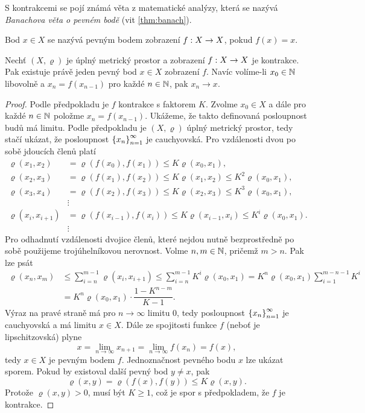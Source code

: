 S kontrakcemi se pojí známá věta z matematické analýzy, která se nazývá \emph{Banachova věta o pevném bodě} (vit \ref{thm:banach}).
\begin{definition}\label{def:pevny-bod}
    Bod $x\in X$ se nazývá pevným bodem zobrazení $f:X \rightarrow X$, pokud $f(x)=x$.
\end{definition}
\begin{theorem}\label{thm:banach}
    Nechť $(X,\varrho)$ je úplný metrický prostor a zobrazení $f:X \rightarrow X$ je kontrakce. Pak existuje právě jeden pevný bod $x\in X$ zobrazení $f$. Navíc volíme-li $x_0\in\mathbb{N}$ libovolně a $x_n=f(x_{n-1})$ pro každé $n\in\mathbb{N}$, pak $x_n\to x$.
\end{theorem}
\begin{proof}
    Podle předpokladu je $f$ kontrakce s faktorem $K$. Zvolme $x_0\in X$ a dále pro každé $n\in\mathbb{N}$ položme $x_n=f(x_{n-1})$. Ukážeme, že takto definovaná posloupnost budů má limitu. Podle předpokladu je $(X,\varrho)$ úplný metrický prostor, tedy stačí ukázat, že posloupnost $\left\{x_n\right\}_{n=1}^\infty$ je cauchyovská. Pro vzdálenosti dvou po sobě jdoucích členů platí
    \begin{align*}
        \varrho(x_1,x_2)&=\varrho(f(x_0),f(x_1))\leqslant K\varrho(x_0,x_1),\\
        \varrho(x_2,x_3)&=\varrho(f(x_1),f(x_2))\leqslant K\varrho(x_1,x_2)\leqslant K^2\varrho(x_0,x_1),\\
        \varrho(x_3,x_4)&=\varrho(f(x_2),f(x_3))\leqslant K\varrho(x_2,x_3)\leqslant K^3\varrho(x_0,x_1),\\
        &\vdots\\
        \varrho(x_i,x_{i+1})&=\varrho(f(x_{i-1}),f(x_i))\leqslant K\varrho(x_{i-1},x_i)\leqslant K^i\varrho(x_0,x_1).\\
        &\vdots
    \end{align*}
    Pro odhadnutí vzdálenosti dvojice členů, které nejdou nutně bezprostředně po sobě použijeme trojúhelníkovou nerovnost. Volme $n,m\in\mathbb{N}$, pričemž $m>n$. Pak lze psát
    \begin{align*}
        \varrho(x_n,x_m)&\leqslant\sum_{i=n}^{m-1}\varrho(x_i,x_{i+1})\leqslant\sum_{i=n}^{m-1}K^i\varrho(x_0,x_1)=K^n\varrho(x_0,x_1)\sum_{i=1}^{m-n-1}K^i\\
        &=K^n\varrho(x_0,x_1)\cdot\dfrac{1-K^{n-m}}{K-1}.
    \end{align*}
    Výraz na pravé straně má pro $n\to\infty$ limitu $0$, tedy posloupnost $\left\{x_n\right\}_{n=1}^\infty$ je cauchyovská a má limitu $x\in X$. Dále ze spojitosti funkce $f$ (neboť je lipschitzovská) plyne
    \[x=\lim_{n\to\infty}x_{n+1}=\lim_{n\to\infty}f(x_n)=f(x),\]
    tedy $x\in X$ je pevným bodem $f$. Jednoznačnost pevného bodu $x$ lze ukázat sporem. Pokud by existoval další pevný bod $y\neq x$, pak
    \[\varrho(x,y)=\varrho(f(x),f(y))\leqslant K\varrho(x,y).\]
    Protože $\varrho(x,y)>0$, musí být $K\geqslant 1$, což je spor s předpokladem, že $f$ je kontrakce.
\end{proof}
